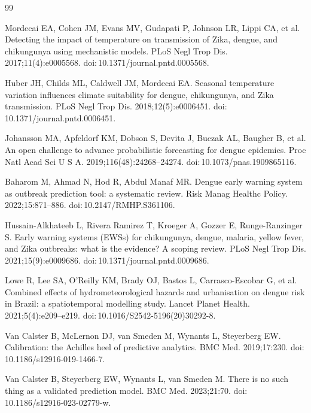 \documentclass[11pt,a4paper]{article}
\begin{document}
\begingroup
{}
\begin{thebibliography}{99}
\setlength{\itemsep}{0pt}\setlength{\parskip}{0pt}

 Mordecai EA, Cohen JM, Evans MV, Gudapati P, Johnson LR, Lippi CA, et al. Detecting the impact of temperature on transmission of Zika, dengue, and chikungunya using mechanistic models. PLoS Negl Trop Dis. 2017;11(4):e0005568. doi:\,10.1371/journal.pntd.0005568.

 Huber JH, Childs ML, Caldwell JM, Mordecai EA. Seasonal temperature variation influences climate suitability for dengue, chikungunya, and Zika transmission. PLoS Negl Trop Dis. 2018;12(5):e0006451. doi:\,10.1371/journal.pntd.0006451.

 Johansson MA, Apfeldorf KM, Dobson S, Devita J, Buczak AL, Baugher B, et al. An open challenge to advance probabilistic forecasting for dengue epidemics. Proc Natl Acad Sci U S A. 2019;116(48):24268--24274. doi:\,10.1073/pnas.1909865116.

 Baharom M, Ahmad N, Hod R, Abdul Manaf MR. Dengue early warning system as outbreak prediction tool: a systematic review. Risk Manag Healthc Policy. 2022;15:871--886. doi:\,10.2147/RMHP.S361106.

 Hussain-Alkhateeb L, Rivera Ramirez T, Kroeger A, Gozzer E, Runge-Ranzinger S. Early warning systems (EWSs) for chikungunya, dengue, malaria, yellow fever, and Zika outbreaks: what is the evidence? A scoping review. PLoS Negl Trop Dis. 2021;15(9):e0009686. doi:\,10.1371/journal.pntd.0009686.

 Lowe R, Lee SA, O'Reilly KM, Brady OJ, Bastos L, Carrasco-Escobar G, et al. Combined effects of hydrometeorological hazards and urbanisation on dengue risk in Brazil: a spatiotemporal modelling study. Lancet Planet Health. 2021;5(4):e209--e219. doi:\,10.1016/S2542-5196(20)30292-8.

 Van Calster B, McLernon DJ, van Smeden M, Wynants L, Steyerberg EW. Calibration: the Achilles heel of predictive analytics. BMC Med. 2019;17:230. doi:\,10.1186/s12916-019-1466-7.

 Van Calster B, Steyerberg EW, Wynants L, van Smeden M. There is no such thing as a validated prediction model. BMC Med. 2023;21:70. doi:\,10.1186/s12916-023-02779-w.


\end{thebibliography}
\end{document}
